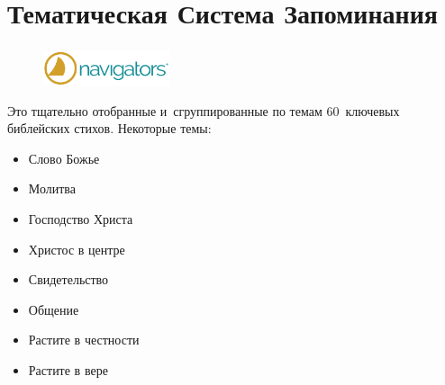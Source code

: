\documentclass[t,aspectratio=169,14pt]{beamer}  %
\def\hy#1{\parbox{\linewidth}{#1}} %
\begin{document}
\section{Тематическая Система Запоминания}
\begin{frame}[c]
	\frametitle{\insertsection}
	\framesubtitle{\insertsubsection}
	\begin{figure}
		\begin{flushright}
		\vspace{-1.8cm}
		\includegraphics[height=1cm]{navs-logo}

	\end{flushright}
		\end{figure}
		\vspace{0.4cm}
	\hy{Это тщательно отобранные и~сгруппированные по темам 60~ключевых библейских стихов.
	Некоторые темы:}
	\vspace{-6pt}

	\begin{itemize}
		\item Слово Божье
		\item Молитва 
		\item Господство Христа
		\item Христос в центре
		\item Свидетельство
		\item Общение
		\item Растите в честности
		\item Растите в вере
	\end{itemize}		
\end{frame}
\end{document}
